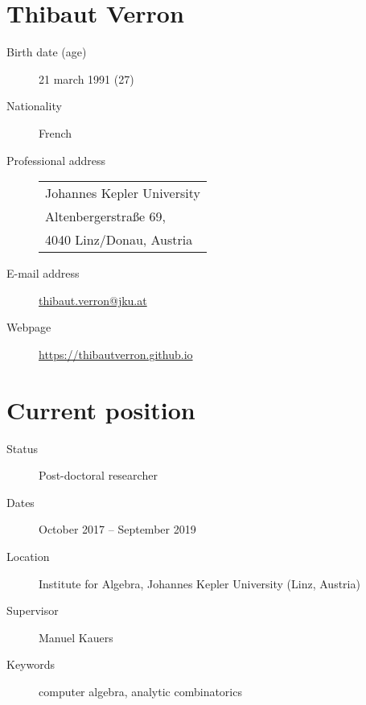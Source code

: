 \documentclass{scrartcl}
\title{}
\date{}
\makeatletter
\newcommand{\pbox}[2][l]{%
  \begin{tabular}[t]{@{}#1@{}}#2\end{tabular}%
}
\makeatother
\begin{document}
\newcommand{\structure}[1]{\textbf{\textsf{#1}}}

\section*{\huge Thibaut Verron}
\label{sec:Inform-pers}


\begin{description}
  \item[Birth date (age)] 21 march 1991 (27)
  \item[Nationality] French
  \item[Professional address]
  \begin{tabular}[t]{l}
    Johannes Kepler University\\
    Altenbergerstraße 69,\\
    4040 Linz/Donau, Austria
  \end{tabular}

  \item[E-mail address] \url{thibaut.verron@jku.at}
  \item[Webpage] \url{https://thibautverron.github.io}
\end{description}

\section*{Current position}
\label{sec:Current-position}

\begin{description}
  \item[Status] Post-doctoral researcher
  \item[Dates] October 2017 -- September 2019
  \item[Location] Institute for Algebra, Johannes Kepler University (Linz, Austria)
  \item[Supervisor] Manuel Kauers
  \item[Keywords] computer algebra, analytic combinatorics
\end{description}
\end{document}
